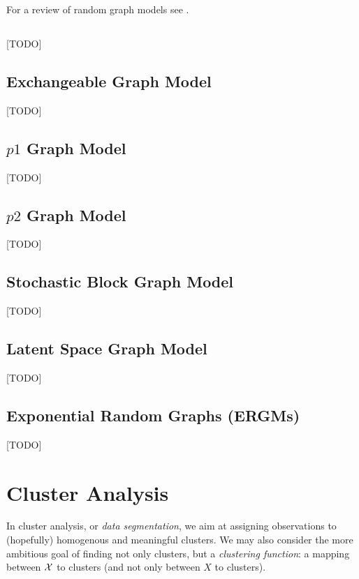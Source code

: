 For a review of random graph models see \cite{goldenberg_survey_2010}.


\subsection{\erdos \renyi}
[TODO]

\subsection{Exchangeable Graph Model}
[TODO]

\subsection{$p1$ Graph Model}
[TODO]

\subsection{$p2$ Graph Model}
[TODO]

\subsection{Stochastic Block Graph Model}
[TODO]

\subsection{Latent Space Graph Model}
[TODO]

\subsection{Exponential Random Graphs (ERGMs)}
[TODO]

\begin{remark}
\end{remark}



\section{Cluster Analysis}
\label{sec:cluster_analysis}

In cluster analysis, or \emph{data segmentation}, we aim at assigning observations to (hopefully) homogenous and meaningful clusters. 
We may also consider the more ambitious goal of finding not only clusters, but a \emph{clustering function}: a mapping between $\mathcal{X}$ to clusters (and not only between $X$ to clusters).

